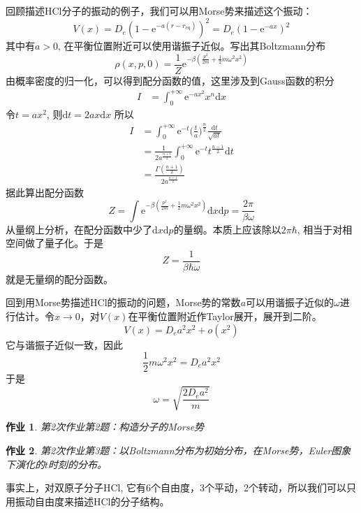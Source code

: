 \documentclass[12pt]{article}
\newtheorem{asg}{作业}
\begin{document}
    回顾描述HCl分子的振动的例子，我们可以用Morse势来描述这个振动：
    \begin{equation*}
        V(x) = D_e (1- \mathrm{e}^{-a(r-r_\mathrm{eq})})^2 = D_e(1-\mathrm{e}^{-ax})^2
    \end{equation*}
    其中有$a>0$, 在平衡位置附近可以使用谐振子近似。写出其Boltzmann分布
    \begin{equation*}
        \rho(x,p,0) = \frac 1Z \mathrm{e}^{-\beta (\frac {p^2}{2m} + \frac 12 m\omega^2 x^2)} 
    \end{equation*}
    由概率密度的归一化，可以得到配分函数的值，这里涉及到Gauss函数的积分
    \begin{align*}
        I &= \int_0^{+\infty} \mathrm{e}^{-ax^2} x^{n} \mathrm{d}x
    \end{align*}
    令$t = ax^2$, 则$\mathrm{d}t = 2ax\mathrm{d}x$
    所以
    \begin{align*}
    I &= \int_0^{+\infty} \mathrm{e}^{-t} \bigg(\frac ta\bigg)^{\frac n2} \frac {\mathrm{d}t}{\sqrt{at}}\\
    &= \frac 1{2a^{\frac {n+1}2}} \int_0^{+\infty} \mathrm{e}^{-t} t^{\frac {n-1}2} \mathrm{d}t\\
    &= \frac {\Gamma(\frac {n+1}2)}{2a^{\frac {n+1}2}}
    \end{align*}
    据此算出配分函数
    \begin{equation*}
        Z = \int \mathrm{e}^{-\beta (\frac {p^2}{2m} + \frac 12 m\omega^2 x^2)} \mathrm{d}x\mathrm{d}p = \frac {2\pi}{\beta \omega}
    \end{equation*}
    从量纲上分析，在配分函数中少了$\mathrm{d}x\mathrm{d}p$的量纲。本质上应该除以$2\pi\hbar$, 相当于对相空间做了量子化。于是
    \begin{equation*}
        Z = \frac 1{\beta \hbar \omega}
    \end{equation*}
    就是无量纲的配分函数。

    回到用Morse势描述HCl的振动的问题，Morse势的常数$a$可以用谐振子近似的$\omega$进行估计。令$x \to 0 $，对$V(x)$在平衡位置附近作Taylor展开，展开到二阶。
    \begin{equation*}
        V(x) = D_e a^2 x^2 + o(x^2)
    \end{equation*}
    它与谐振子近似一致，因此
    \begin{equation*}
        \frac 12 m\omega^2x^2 = D_e a^2 x^2
    \end{equation*}
    于是
    \begin{equation*}
        \omega = \sqrt{\frac {2D_ea^2}m}
    \end{equation*}
    \begin{asg}
        第2次作业第2题：构造分子的Morse势
    \end{asg}
    \begin{asg}
        第2次作业第3题：以Boltzmann分布为初始分布，在Morse势，Euler图象下演化的$t$时刻的分布。
    \end{asg}
    事实上，对双原子分子HCl, 它有6个自由度，3个平动，2个转动，所以我们可以只用振动自由度来描述HCl的分子结构。
\end{document}
